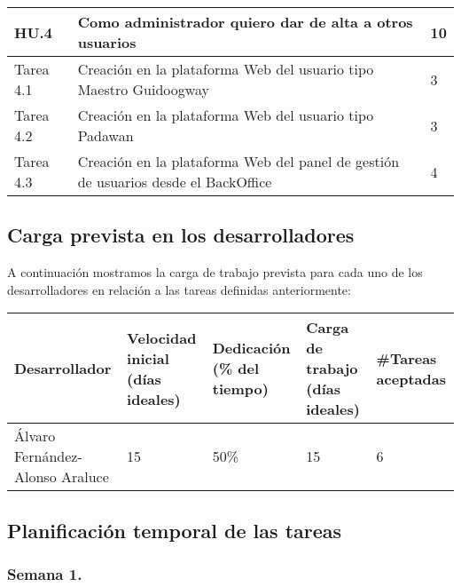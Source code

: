\begin{table}[h]
	\centering
	\begin{tabular}{| p{2.3cm} | p{6.7cm} | p{2cm} |}
		\rowcolor[HTML]{329A9D} 
		{\color[HTML]{FFFFFF} \textbf{HU.4}} & {\color[HTML]{FFFFFF} \textbf{Como administrador quiero dar de alta a otros usuarios}} & {\color[HTML]{FFFFFF} \textbf{10}}  \\ \hline
		Tarea 4.1 & Creación en la plataforma Web del usuario tipo Maestro Guidoogway & 3 \\ \hline
		Tarea 4.2 & Creación en la plataforma Web del usuario tipo Padawan & 3 \\ \hline
		Tarea 4.3 & Creación en la plataforma Web del panel de gestión de usuarios desde el BackOffice & 4 \\ \hline
	\end{tabular}
\end{table}

\newpage
\subsection{Carga prevista en los desarrolladores}

A continuación mostramos la carga de trabajo prevista para cada uno de los desarrolladores en relación a las tareas definidas anteriormente:

\begin{table}[h]
	\centering
	\begin{tabular}{| p{3cm} | p{2cm} | p{2cm} | p{2cm} | p{2cm} |}
		\rowcolor[HTML]{329A9D} 
		{\color[HTML]{FFFFFF} \textbf{Desarrollador}} & {\color[HTML]{FFFFFF} \textbf{Velocidad inicial (días ideales)}} & {\color[HTML]{FFFFFF} \textbf{Dedicación (\% del tiempo)}} & {\color[HTML]{FFFFFF} \textbf{Carga de trabajo (días ideales)}} & {\color[HTML]{FFFFFF} \textbf{\#Tareas aceptadas}}  \\ \hline
		Álvaro Fernández-Alonso Araluce & 15 & 50\% & 15 & 6 \\ \hline
	\end{tabular}
\end{table}

\newpage

\subsection{Planificación temporal de las tareas}

\subsubsection{Semana 1.}

